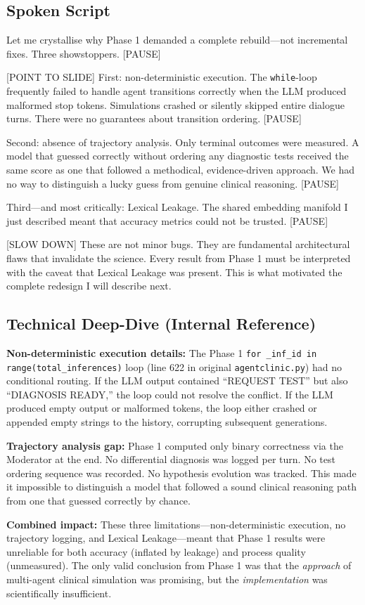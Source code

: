 \documentclass[12pt]{article}
\begin{document}
  \subsection*{Spoken Script}
  \begin{spokenbox}
   Let me crystallise why Phase 1 demanded a complete rebuild---not incremental fixes. Three showstoppers. [PAUSE]

  [POINT TO SLIDE] First: non-deterministic execution. The \texttt{while}-loop frequently failed to handle agent transitions correctly when the LLM produced malformed stop tokens. Simulations crashed or silently skipped entire dialogue turns. There were no guarantees about transition ordering. [PAUSE]

  Second: absence of trajectory analysis. Only terminal outcomes were measured. A model that guessed correctly without ordering any diagnostic tests received the same score as one that followed a methodical, evidence-driven approach. We had no way to distinguish a lucky guess from genuine clinical reasoning. [PAUSE]

  Third---and most critically: Lexical Leakage. The shared embedding manifold I just described meant that accuracy metrics could not be trusted. [PAUSE]

  [SLOW DOWN] These are not minor bugs. They are fundamental architectural flaws that invalidate the science. Every result from Phase 1 must be interpreted with the caveat that Lexical Leakage was present. This is what motivated the complete redesign I will describe next.
  \end{spokenbox}

  \subsection*{Technical Deep-Dive (Internal Reference)}
  {\color{techgray}
  \textbf{Non-deterministic execution details:} The Phase 1 \texttt{for \_inf\_id in range(total\_inferences)} loop (line 622 in original \texttt{agentclinic.py}) had no conditional routing. If the LLM output contained ``REQUEST TEST'' but also ``DIAGNOSIS READY,'' the loop could not resolve the conflict. If the LLM produced empty output or malformed tokens, the loop either crashed or appended empty strings to the history, corrupting subsequent generations.

  \textbf{Trajectory analysis gap:} Phase 1 computed only binary correctness via the Moderator at the end. No differential diagnosis was logged per turn. No test ordering sequence was recorded. No hypothesis evolution was tracked. This made it impossible to distinguish a model that followed a sound clinical reasoning path from one that guessed correctly by chance.

  \textbf{Combined impact:} These three limitations---non-deterministic execution, no trajectory logging, and Lexical Leakage---meant that Phase 1 results were unreliable for both accuracy (inflated by leakage) and process quality (unmeasured). The only valid conclusion from Phase 1 was that the \textit{approach} of multi-agent clinical simulation was promising, but the \textit{implementation} was scientifically insufficient.
  }
\end{document}
